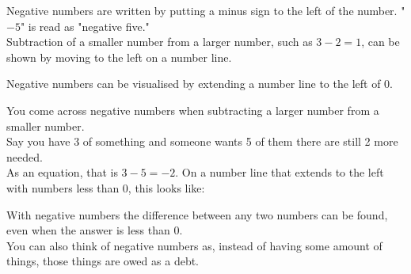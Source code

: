 \documentclass[12pt]{article}
\begin{document}
{Negative numbers are written by putting a minus sign to the left of the number. "$-5$" is read as "negative five."\\

Subtraction of a smaller number from a larger number, such as $3-2=1$, can be shown by moving to the left on a number line.\\


Negative numbers can be visualised by extending a number line to the left of 0.\\

\begin{center}
\end{center}

You come across negative numbers when subtracting a larger number from a smaller number.\\

Say you have 3 of something  and someone wants 5 of them  there are still 2 more needed. \\

As an equation, that is $3-5=-2$. On a number line that extends to the left with numbers less than 0, this looks like:


 With negative numbers the difference between any two numbers can be found, even when the answer is less than 0.\\

 You can also think of negative numbers as, instead of having some amount of things, those things are owed as a debt.

}
\end{document}
